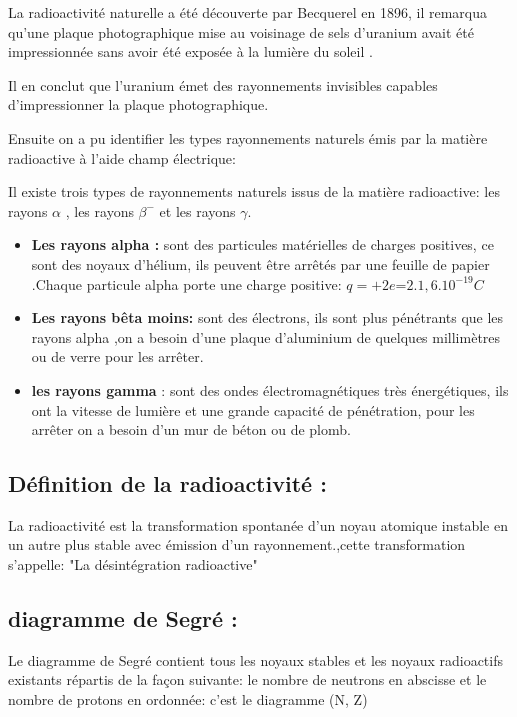 \documentclass[12pt]{article}
\begin{document}
La radioactivité naturelle a été découverte par Becquerel en 1896, il remarqua qu'une plaque photographique mise au
voisinage de sels d'uranium avait été impressionnée sans avoir été exposée à la lumière du soleil .

Il en conclut que l'uranium
émet des rayonnements invisibles capables d'impressionner la plaque photographique.

Ensuite on a pu identifier les types rayonnements naturels émis par la matière radioactive à l'aide champ électrique:

Il existe trois types de rayonnements naturels issus de la matière radioactive: les rayons $\alpha$ , les rayons $\beta^-$
et les rayons $\gamma$.

\begin{itemize}
	\item \textbf{Les rayons alpha : }sont des particules matérielles de charges positives, ce sont des noyaux d'hélium, ils peuvent être arrêtés par une feuille de papier .Chaque particule alpha porte une charge positive: $q=+2e$=$2.1,6.10^{-19}C$

	\item \textbf{Les rayons bêta  moins:} sont des électrons, ils sont plus pénétrants que les rayons alpha ,on a besoin d'une plaque
d'aluminium de quelques millimètres ou de verre pour les arrêter.

\item \textbf{ les rayons gamma }: sont des ondes électromagnétiques très énergétiques, ils ont la vitesse de lumière et une grande
capacité de pénétration, pour les arrêter on a besoin d'un mur de béton ou de plomb.
\end{itemize}


\subsection{Définition de la radioactivité : }

La radioactivité est la transformation spontanée d’un noyau atomique instable en un autre plus stable avec émission d'un
rayonnement.,cette transformation s'appelle: "La désintégration radioactive"

\subsection{diagramme de Segré : }
Le diagramme de Segré contient tous les noyaux stables et les noyaux radioactifs existants répartis de la façon suivante: le
nombre de neutrons en abscisse et le nombre de protons en ordonnée: c'est le diagramme (N, Z) 
\end{document}
